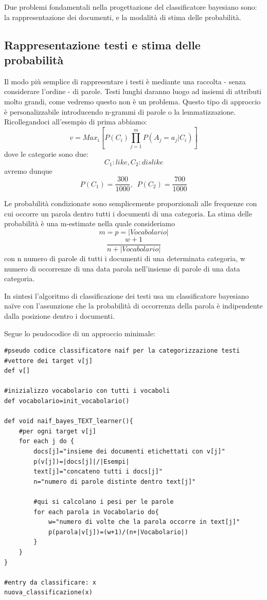 \documentclass{article}
\theoremstyle{plain}
\theoremstyle{definition}
\begin{document}
Due problemi fondamentali nella progettazione del classificatore bayesiano sono: la rappresentazione dei documenti, e la modalità di stima delle probabilità.

\subsection{Rappresentazione testi e stima delle probabilità}
Il modo più semplice di rappresentare i testi è mediante una raccolta - senza considerare l'ordine - di parole. Testi lunghi daranno luogo ad insiemi di attributi molto grandi, come vedremo questo non è un problema. Questo tipo di approccio è personalizzabile introducendo n-grammi di parole o la lemmatizzazione.
Ricollegandoci all'esempio di prima abbiamo: 
$$v=Max_i [P(C_i)\prod_{j=1}^m P(A_j=a_j|C_i)]$$
dove le categorie sono due: $$C_1:like, C_2:dislike$$
avremo dunque $$P(C_1)=\frac{300}{1000},\,\,\, P(C_2)=\frac{700}{1000}$$

Le probabilità condizionate sono semplicemente proporzionali alle frequenze con cui occorre un parola dentro tutti i documenti di una categoria.
La stima delle probabilità è una m-estimate nella quale consideriamo $$m=p=|Vocabolario|$$
$$\frac{w+1}{n+|Vocabolario|}$$
con n numero di parole di tutti i documenti di una determinata categoria, w numero di occorrenze di una data parola nell'insieme di parole di una data categoria.

In sintesi l'algoritmo di classificazione dei testi usa un classificatore bayesiano naïve con l'assunzione che la probabilità di occorrenza della parola è indipendente dalla posizione dentro i documenti.

Segue lo psudocodice di un approccio minimale:
\begin{lstlisting}
#pseudo codice classificatore naif per la categorizzazione testi
#vettore dei target v[j]
def v[]

#inizializzo vocabolario con tutti i vocaboli
def vocabolario=init_vocabolario()

def void naif_bayes_TEXT_learner(){
	#per ogni target v[j]
	for each j do {
		docs[j]="insieme dei documenti etichettati con v[j]"
		p(v[j])=|docs[j]|/|Esempi|
		text[j]="concateno tutti i docs[j]"
		n="numero di parole distinte dentro text[j]"
		
		#qui si calcolano i pesi per le parole
		for each parola in Vocabolario do{
			w="numero di volte che la parola occorre in text[j]"
			p(parola|v[j])=(w+1)/(n+|Vocabolario|)
		}
	}
}

#entry da classificare: x
nuova_classificazione(x)
\end{lstlisting}
\end{document}
